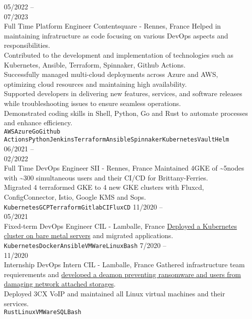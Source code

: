 \documentclass[10pt]{developercv} %
\begin{document}
\begin{entrylist}
	\entry
		{05/2022 --\\07/2023\\\footnotesize{Full Time}}
		{Platform Engineer}
		{Contentsquare - Rennes, France}
		{Helped in maintaining infratructure as code focusing on various DevOps aspects and responsibilities.\\
		Contributed to the development and implementation of technologies such as Kubernetes, Ansible, Terraform, Spinnaker, Github Actions.\\
		Successfully managed multi-cloud deployments across Azure and AWS, optimizing cloud resources and maintaining high availability.\\
		Supported developers in delivering new features, services, and software releases while troubleshooting issues to ensure seamless operations.\\
		Demonstrated coding skills in Shell, Python, Go and Rust to automate processes and enhance efficiency.\\
		\texttt{AWS}\slashsep\texttt{Azure}\slashsep\texttt{Go}\slashsep\texttt{Github Actions}\slashsep\texttt{Python}\slashsep\texttt{Jenkins}\slashsep\texttt{Terraform}\slashsep\texttt{Ansible}\slashsep\texttt{Spinnaker}\slashsep\texttt{Kubernetes}\slashsep\texttt{Vault}\slashsep\texttt{Helm}}
	\entry
		{06/2021 --\\02/2022\\\footnotesize{Full Time}}
		{DevOps Engineer}
		{SII - Rennes, France}
		{Maintained 4GKE of \textasciitilde5nodes with \textasciitilde300 simultaneous users and their CI/CD for Brittany-Ferries.\\
Migrated 4 terraformed GKE to 4 new GKE clusters with Fluxcd, ConfigConnector, Istio, Google KMS and Sops.\\
		\texttt{Kubernetes}\slashsep\texttt{GCP}\slashsep\texttt{Terraform}\slashsep\texttt{GitlabCI}\slashsep\texttt{FluxCD}}
	\entry
		{11/2020 --\\05/2021\\\footnotesize{Fixed-term}}
		{DevOps Engineer}
		{CIL - Lamballe, France}
		{\href{https://github.com/Ant0wan/VMWare-Kubenetes-cluster}{Deployed a Kubernetes cluster on bare metal servers} and migrated applications.\\
		\texttt{Kubernetes}\slashsep\texttt{Docker}\slashsep\texttt{Ansible}\slashsep\texttt{VMWare}\slashsep\texttt{Linux}\slashsep\texttt{Bash}}
	\entry
		{7/2020 --\\11/2020\\\footnotesize{Internship}}
		{DevOps Intern}
		{CIL - Lamballe, France}
		{Gathered infrastructure team requierements and \href{https://github.com/Ant0wan/Randetect}{developed a deamon preventing ransomware and users from damaging network attached storages}.\\
Deployed 3CX VoIP and maintained all Linux virtual machines and their services.\\
		\texttt{Rust}\slashsep\texttt{Linux}\slashsep\texttt{VMWare}\slashsep\texttt{SQL}\slashsep\texttt{Bash}}
\end{entrylist}
\end{document}
